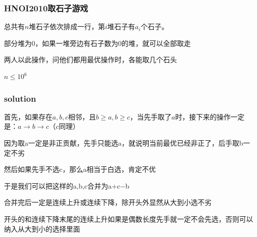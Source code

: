 \documentclass[10pt]{beamer}
\begin{document}
	\clearpage
	\begin{frame}
		\frametitle{HNOI2010取石子游戏}
		\par 总共有$n$堆石子依次排成一行，第$i$堆石子有$a_i$个石子。
		\par 部分堆为$0$，如果一堆旁边有石子数为$0$的堆，就可以全部取走
		\par 两人以此操作，问他们都用最优操作时，各能取几个石头
		\par $n\le 10^6$
	\end{frame}
	\clearpage
	\begin{frame}
		\frametitle{solution}
		 首先，如果存在$a,b,c$相邻，且$b\ge a,b\ge c$，当先手取了$a$时，接下来的操作一定是：$a\rightarrow b\rightarrow c$（$c$同理）

		 因为取a一定是非正贡献，先手只能选a，就说明当前最优已经非正了，后手取b一定不劣

		 然后如果先手不选c，那么a相当于白选，肯定不优

		 于是我们可以把这样的a,b,c合并为a+c−b

		 合并完后一定是连续上升或连续下降，除开头外显然从大到小选不劣

		 开头的和连续下降末尾的连续上升如果是偶数长度先手就一定不会先选，否则可以纳入从大到小的选择里面

	\end{frame}
\end{document}
